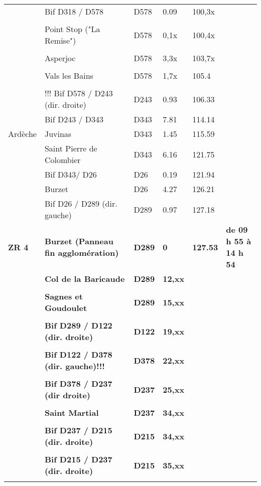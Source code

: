 \documentclass{article}%
\begin{document}
\begin{longtable}{p{2.25cm}|p{7.0cm}|p{1.5cm}|p{1.5cm}|p{1.5cm}|p{3.5cm}}
 &Bif D318 / D578 &D578&0.09&100,3x& \\%
 & & & & & \\%
 &Point Stop  ("La Remise")&D578 &0,1x&100,4x& \\%
 & & & & & \\%
 &Asperjoc&D578&3,3x&103,7x& \\%
 & & & & & \\%
 &Vals les Bains&D578&1,7x&105.4& \\%
 & & & & & \\%
 &!!! Bif D578 / D243 (dir. droite)&D243&0.93&106.33& \\%
 &Bif D243 / D343&D343&7.81&114.14& \\%
Ardèche&Juvinas&D343&1.45&115.59& \\%
 &Saint Pierre de Colombier&D343&6.16&121.75& \\%
 &Bif D343/ D26&D26&0.19&121.94& \\%
 &Burzet&D26 &4.27&126.21& \\%
 &Bif D26 / D289 (dir. gauche)&D289&0.97&127.18& \\%
\textbf{ZR 4}&\textbf{Burzet (Panneau fin agglomération)}&\textbf{D289}&\textbf{0}&\textbf{127.53}&\textbf{de 09 h 55 à 14 h 54}\\%
 &\textbf{Col de la Baricaude}&\textbf{D289}&\textbf{12,xx}& & \\%
 & & & & & \\%
 &\textbf{Sagnes et Goudoulet  }&\textbf{D289}&\textbf{15,xx}& & \\%
 & & & & & \\%
 &\textbf{Bif D289 / D122 (dir. droite)}&\textbf{D122}&\textbf{19,xx}& & \\%
 & & & & & \\%
 &\textbf{Bif D122 / D378 (dir. gauche)!!!}&\textbf{D378 }&\textbf{22,xx}& & \\%
 & & & & & \\%
 &\textbf{Bif D378 / D237 (dir droite)}&\textbf{D237}&\textbf{25,xx}& & \\%
 & & & & & \\%
 &\textbf{Saint Martial }&\textbf{D237}&\textbf{34,xx}& & \\%
 & & & & & \\%
 &\textbf{Bif D237 / D215 (dir. droite)}&\textbf{D215}&\textbf{34,xx}& & \\%
 & & & & & \\%
 &\textbf{Bif D215 / D237 (dir. droite)}&\textbf{D215}&\textbf{35,xx}& & \\%
 & & & & & \\%

\end{longtable}
\end{document}
